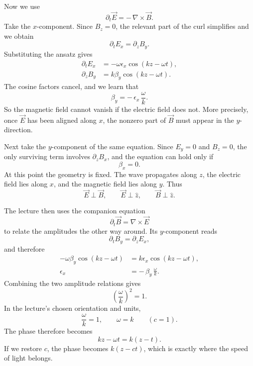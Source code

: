 Now we use
\begin{equation}
\partial_t\vec E=-\,\nabla\times\vec B.
\end{equation}
Take the \(x\)-component. Since \(B_z=0\), the relevant part of the curl simplifies and we obtain
\begin{equation}
\partial_t E_x=\partial_z B_y.
\end{equation}
Substituting the ansatz gives
\begin{align}
\partial_t E_x
&=
-\omega\epsilon_x\cos(kz-\omega t),
\\
\partial_z B_y
&=
k\beta_y\cos(kz-\omega t).
\end{align}
The cosine factors cancel, and we learn that
\begin{equation}
\beta_y=-\,\epsilon_x\,\frac{\omega}{k}.
\end{equation}
So the magnetic field cannot vanish if the electric field does not. More precisely, once \(\vec E\) has been aligned along \(x\), the nonzero part of \(\vec B\) must appear in the \(y\)-direction.

Next take the \(y\)-component of the same equation. Since \(E_y=0\) and \(B_z=0\), the only surviving term involves \(\partial_z B_x\), and the equation can hold only if
\begin{equation}
\beta_x=0.
\end{equation}
At this point the geometry is fixed. The wave propagates along \(z\), the electric field lies along \(x\), and the magnetic field lies along \(y\). Thus
\begin{equation}
\vec E\perp \vec B,
\qquad
\vec E\perp \hat z,
\qquad
\vec B\perp \hat z.
\end{equation}

The lecture then uses the companion equation
\begin{equation}
\partial_t\vec B=\nabla\times\vec E
\end{equation}
to relate the amplitudes the other way around. Its \(y\)-component reads
\begin{equation}
\partial_t B_y=\partial_z E_x,
\end{equation}
and therefore
\begin{align}
-\omega\beta_y\cos(kz-\omega t)
&=
k\epsilon_x\cos(kz-\omega t),
\\
\epsilon_x
&=
-\,\beta_y\,\frac{\omega}{k}.
\end{align}
Combining the two amplitude relations gives
\begin{equation}
\left(\frac{\omega}{k}\right)^2=1.
\end{equation}
In the lecture's chosen orientation and units,
\begin{equation}
\frac{\omega}{k}=1,
\qquad
\omega=k
\qquad
(c=1).
\end{equation}
The phase therefore becomes
\begin{equation}
kz-\omega t=k(z-t).
\end{equation}
If we restore \(c\), the phase becomes \(k(z-ct)\), which is exactly where the speed of light belongs.

